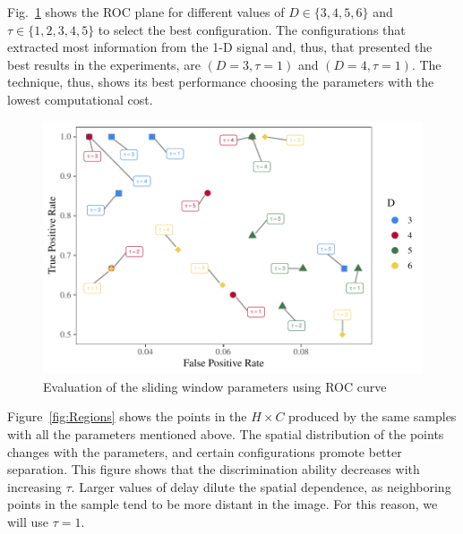 \documentclass[journal]{IEEEtran}
\begin{document}
Fig.~\ref{fig:ROC} shows the ROC plane for different values of $D \in \{3, 4, 5, 6 \} $ and $\tau \in \{1, 2, 3, 4, 5 \}$ to select the best configuration.
The configurations that extracted most information from the \mbox{1-D} signal and, thus, that presented the best results in the experiments, are $(D = 3, \tau = 1)$ and $(D = 4, \tau = 1)$.
The technique, thus, shows its best performance choosing the parameters with the lowest computational cost.

\begin{figure}[hbt]
	\includegraphics[width=\columnwidth]{Figures/ROC.pdf}
	\caption{Evaluation of the sliding window parameters using ROC curve}
	\label{fig:ROC}
\end{figure} 


Figure~\ref{fig:Regions} shows the points in the $H\times C$ produced by the same samples with all the parameters mentioned above.
The spatial distribution of the points changes with the parameters,
and certain configurations promote better separation.
This figure shows that the discrimination ability decreases with increasing $\tau$.
Larger values of delay dilute the spatial dependence, as neighboring points in the sample tend to be more distant in the image.
For this reason, we will use $\tau=1$.
\end{document}
